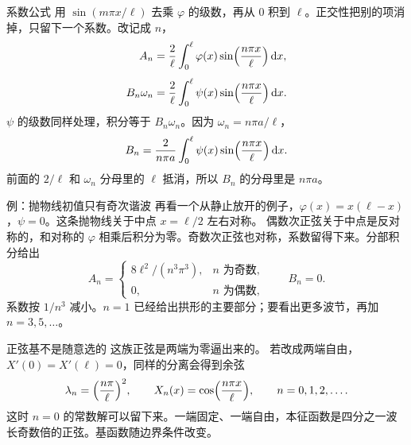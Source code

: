 \documentclass[fontset=windows, chinese, 10pt, xcolor=dvipsnames]{beamer}
\begin{document}
\begin{frame}{系数公式}
  用 $\sin(m\pi x/\ell)$ 去乘 $\varphi$ 的级数，再从 $0$ 积到 $\ell$。正交性把别的项消掉，只留下一个系数。改记成 $n$，
  \begin{align*}
    A_n&=\frac{2}{\ell}\int_0^{\ell}
      \varphi(x)\sin\Bigl(\frac{n\pi x}{\ell}\Bigr)\,\mathrm{d}x,\\[4pt]
    B_n\omega_n&=\frac{2}{\ell}\int_0^{\ell}
      \psi(x)\sin\Bigl(\frac{n\pi x}{\ell}\Bigr)\,\mathrm{d}x.
  \end{align*}
  $\psi$ 的级数同样处理，积分等于 $B_n\omega_n$。因为 $\omega_n=n\pi a/\ell$，
  \begin{equation*}
    B_n=\frac{2}{n\pi a}\int_0^{\ell}
      \psi(x)\sin\Bigl(\frac{n\pi x}{\ell}\Bigr)\,\mathrm{d}x.
  \end{equation*}
  前面的 $2/\ell$ 和 $\omega_n$ 分母里的 $\ell$ 抵消，所以 $B_n$ 的分母里是 $n\pi a$。
\end{frame}

\begin{frame}{例：抛物线初值只有奇次谐波}
  再看一个从静止放开的例子，$\varphi(x)=x(\ell-x)$，$\psi=0$。这条抛物线关于中点 $x=\ell/2$ 左右对称。
  \vspace{0.3em}
  偶数次正弦关于中点是反对称的，和对称的 $\varphi$ 相乘后积分为零。奇数次正弦也对称，系数留得下来。分部积分给出
  \begin{equation*}
    A_n=
    \begin{cases}
      8\ell^{2}/(n^{3}\pi^{3}), & n\text{ 为奇数},\\
      0, & n\text{ 为偶数},
    \end{cases}
    \qquad B_n=0.
  \end{equation*}
  系数按 $1/n^3$ 减小。$n=1$ 已经给出拱形的主要部分；要看出更多波节，再加 $n=3,5,\ldots$。
\end{frame}

\begin{frame}{正弦基不是随意选的}
  这族正弦是两端为零逼出来的。
  \vspace{0.35em}
  若改成两端自由，$X'(0)=X'(\ell)=0$，同样的分离会得到余弦
  \begin{equation*}
    \lambda_n=\Bigl(\frac{n\pi}{\ell}\Bigr)^2,
    \qquad
    X_n(x)=\cos\Bigl(\frac{n\pi x}{\ell}\Bigr),
    \qquad n=0,1,2,\ldots.
  \end{equation*}
  这时 $n=0$ 的常数解可以留下来。一端固定、一端自由，本征函数是四分之一波长奇数倍的正弦。基函数随边界条件改变。
\end{frame}
\end{document}
